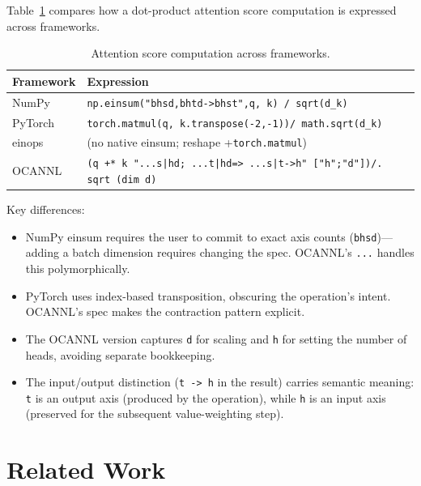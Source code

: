 \documentclass[acmsmall,nonacm,review]{acmart}
\newcommand{\code}[1]{\lstinline[basicstyle=\normalsize\ttfamily]{#1}}
\newcommand{\spec}[1]{\texttt{\small #1}}
\begin{document}
Table~\ref{tab:comparison} compares how a dot-product attention score
computation is expressed across frameworks.

\begin{table}[t]
\caption{Attention score computation across frameworks.}
\label{tab:comparison}
\small
\begin{tabular}{@{}lp{5.5cm}@{}}
\toprule
\textbf{Framework} & \textbf{Expression} \\
\midrule
NumPy &
\texttt{np.einsum("bhsd,bhtd->bhst",\linebreak q, k) / sqrt(d\_k)} \\[3pt]
PyTorch &
\texttt{torch.matmul(q, k.transpose(-2,-1))\linebreak / math.sqrt(d\_k)} \\[3pt]
einops &
(no native einsum; reshape +\linebreak\texttt{torch.matmul}) \\[3pt]
OCANNL &
\texttt{(q +* k "...s|hd; ...t|hd\linebreak => ...s|t->h" ["h";"d"])\linebreak /. sqrt (dim d)} \\
\bottomrule
\end{tabular}
\end{table}

Key differences:
\begin{itemize}
\item NumPy einsum requires the user to commit to exact axis counts
  (\spec{bhsd})---adding a batch dimension requires changing the spec.
  OCANNL's \spec{...} handles this polymorphically.
\item PyTorch uses index-based transposition, obscuring the operation's intent.
  OCANNL's spec makes the contraction pattern explicit.
\item The OCANNL version captures \code{d} for scaling and \code{h} for
  setting the number of heads, avoiding separate bookkeeping.
\item The input/output distinction (\spec{t -> h} in the result) carries
  semantic meaning: \spec{t} is an output axis (produced by the operation),
  while \spec{h} is an input axis (preserved for the subsequent
  value-weighting step).
\end{itemize}

\section{Related Work}
\label{sec:related}
\end{document}
